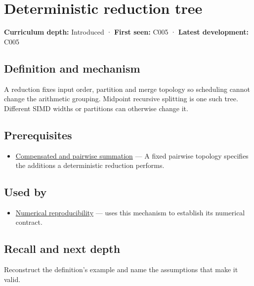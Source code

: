 \hypertarget{appendix-4c8e0238e7ee}{}\label{referencestart:appendix-4c8e0238e7ee}
\section{Deterministic reduction tree}\label{appendix-4c8e0238e7ee-deterministic-reduction-tree}

\textbf{Curriculum depth:} Introduced · \textbf{First seen:} C005 · \textbf{Latest development:} C005

\subsection{Definition and mechanism}\label{appendix-4c8e0238e7ee-definition-and-mechanism}

A reduction fixes input order, partition and merge topology so scheduling cannot change the arithmetic grouping. Midpoint recursive splitting is one such tree. Different SIMD widths or partitions can otherwise change it.

\subsection{Prerequisites}\label{appendix-4c8e0238e7ee-prerequisites}

\begin{itemize}
\tightlist
\item
  \hyperref[appendix-df318da57389]{Compensated and pairwise summation} --- A fixed pairwise topology specifies the additions a deterministic reduction performs.
\end{itemize}

\subsection{Used by}\label{appendix-4c8e0238e7ee-used-by}

\begin{itemize}
\tightlist
\item
  \hyperref[appendix-5f1a2c3f97ff]{Numerical reproducibility} --- uses this mechanism to establish its numerical contract.
\end{itemize}

\subsection{Recall and next depth}\label{appendix-4c8e0238e7ee-recall-and-next-depth}

Reconstruct the definition's example and name the assumptions that make it valid.

